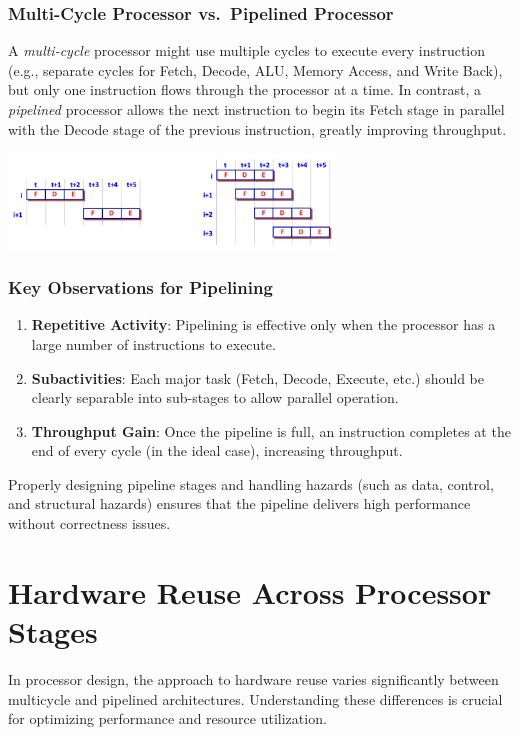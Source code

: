 \subsubsection*{Multi-Cycle Processor vs.\ Pipelined Processor}
A \emph{multi-cycle} processor might use multiple cycles to execute every instruction (e.g., separate cycles for Fetch, Decode, ALU, Memory Access, and Write Back), but only one instruction flows through the processor at a time. In contrast, a \emph{pipelined} processor allows the next instruction to begin its Fetch stage in parallel with the Decode stage of the previous instruction, greatly improving throughput.
\begin{center}
    \includegraphics[width=0.65\textwidth]{chapters/chapter4c/images/vs.png}
\end{center}
\subsubsection*{Key Observations for Pipelining}
\begin{enumerate}
    \item \textbf{Repetitive Activity}: Pipelining is effective only when the processor has a large number of instructions to execute.
    \item \textbf{Subactivities}: Each major task (Fetch, Decode, Execute, etc.) should be clearly separable into sub-stages to allow parallel operation.
    \item \textbf{Throughput Gain}: Once the pipeline is full, an instruction completes at the end of every cycle (in the ideal case), increasing throughput.
\end{enumerate}

\noindent Properly designing pipeline stages and handling hazards (such as data, control, and structural hazards) ensures that the pipeline delivers high performance without correctness issues.

\section{Hardware Reuse Across Processor Stages}

In processor design, the approach to hardware reuse varies significantly between multicycle and pipelined architectures. Understanding these differences is crucial for optimizing performance and resource utilization.

